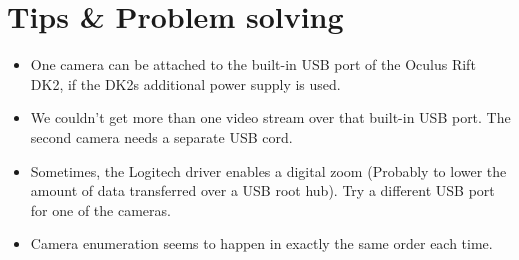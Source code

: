 \newpage
\section{Tips \& Problem solving}\label{tips-problem-solving}

\begin{itemize}
\itemsep1pt\parskip0pt
\item
  One camera can be attached to the built-in USB port of the Oculus Rift DK2, if the DK2s additional power supply is used.
\item
  We couldn't get more than one video stream over that built-in USB port. The second camera needs a separate USB cord.
\item
  Sometimes, the Logitech driver enables a digital zoom (Probably to lower the amount of data transferred over a USB root hub). Try a different USB port for one of the cameras.
\item
  Camera enumeration seems to happen in exactly the same order each time.
\end{itemize}